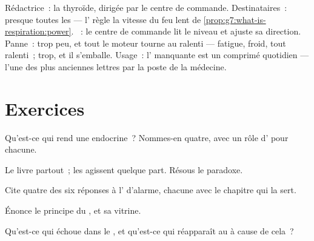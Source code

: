 \begin{example}\label{ex:g8:hormonal-communication:thyroid}
Rédactrice~: la thyroïde, dirigée par le centre de commande.
Destinataires~: presque toutes les  --- l'
règle la vitesse du feu lent de
\cref{prop:g7:what-is-respiration:power}. ~: le
centre de commande lit le niveau et ajuste sa direction.
Panne~: trop peu, et tout le moteur tourne au ralenti ---
fatigue, froid, tout ralenti~; trop, et il s'emballe. Usage~:
l' manquante est un comprimé quotidien --- l'une des
plus anciennes lettres par la poste de la médecine.
\end{example}

\section{Exercices}

\begin{exercise}[$\star$]\label{exo:g8:hormonal-communication:1}
Qu'est-ce qui rend une  endocrine~? Nommes-en quatre,
avec un rôle d' pour chacune.
\end{exercise}

\begin{exercise}[$\star$]\label{exo:g8:hormonal-communication:2}
Le  livre partout~; les  agissent quelque part.
Résous le paradoxe.
\end{exercise}

\begin{exercise}[$\star$]\label{exo:g8:hormonal-communication:3}
Cite quatre des six réponses à l' d'alarme, chacune
avec le chapitre qui la sert.
\end{exercise}

\begin{exercise}[$\star$]\label{exo:g8:hormonal-communication:4}
Énonce le principe du , et sa vitrine.
\end{exercise}

\begin{exercise}[$\star$]\label{exo:g8:hormonal-communication:5}
Qu'est-ce qui échoue dans le , et qu'est-ce qui
réapparaît au  à cause de cela~?
\end{exercise}

